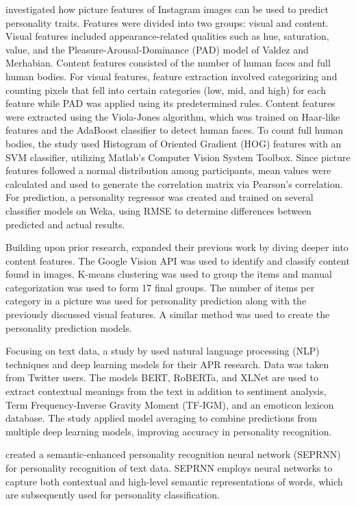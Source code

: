 \citet{Ferwerda2016} investigated how picture features of Instagram images can be used to predict personality traits. Features were divided into two groups: visual and content. Visual features included appearance-related qualities such as hue, saturation, value, and the Pleasure-Arousal-Dominance (PAD) model of Valdez and Merhabian. Content features consisted of the number of human faces and full human bodies. For visual features, feature extraction involved categorizing and counting pixels that fell into certain categories (low, mid, and high) for each feature while PAD was applied using its predetermined rules. Content features were extracted using the Viola-Jones algorithm, which was trained on Haar-like features and the AdaBoost classifier to detect human faces. To count full human bodies, the study used Histogram of Oriented Gradient (HOG) features with an SVM classifier, utilizing Matlab’s Computer Vision System Toolbox. Since picture features followed a normal distribution among participants, mean values were calculated and used to generate the correlation matrix via Pearson’s correlation. For prediction, a personality regressor was created and trained on several classifier models on Weka, using RMSE to determine differences between predicted and actual results. 

Building upon prior research, \citet{Ferwerda2018} expanded their previous work by diving deeper into content features. The Google Vision API was used to identify and classify content found in images. K-means clustering was used to group the items and manual categorization was used to form 17 final groups. The number of items per category in a picture was used for personality prediction along with the previously discussed visual features. A similar method was used to create the personality prediction models. 

Focusing on text data, a study by \citet{Christian2021} used natural language processing (NLP) techniques and deep learning models for their APR research. Data was taken from Twitter users. The models BERT, RoBERTa, and XLNet are used to extract contextual meanings from the text in addition to sentiment analysis, Term Frequency-Inverse Gravity Moment (TF-IGM), and an emoticon lexicon database. The study applied model averaging to combine predictions from multiple deep learning models, improving accuracy in personality recognition.

\citet{Xue2021} created a semantic-enhanced personality recognition neural network (SEPRNN) for personality recognition of text data. SEPRNN employs neural networks to capture both contextual and high-level semantic representations of words, which are subsequently used for personality classification.

